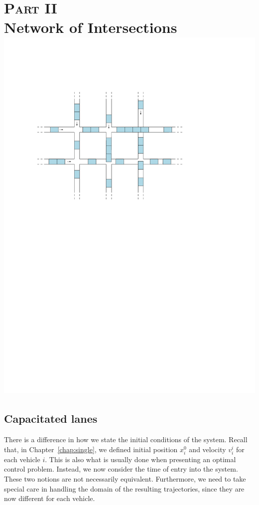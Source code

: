 \documentclass[a4paper]{report}
\theoremstyle{definition}
\theoremstyle{plain}
\newcommand\note[1]{{\color{Navy}#1}}
\begin{document}
\part*{\hspace{-0.8em}\textsc{Part II}\\[0.6em] Network of Intersections\\[3em]
       \centering\includegraphics[scale=1]{figures/network-intersections}}

\chapter{Capacitated lanes}\label{chap:network}

\note{
There is a difference in how we state the initial conditions of the system.
%
Recall that, in Chapter~\ref{chap:single}, we defined initial position
$x_{i}^{0}$ and velocity $v_{i}^{i}$ for each vehicle $i$.
This is also what is usually done when presenting an optimal control problem.
%
Instead, we now consider the time of entry into the system.
%
These two notions are not necessarily equivalent.
%
Furthermore, we need to take special care in handling the domain of the
resulting trajectories, since they are now different for each vehicle.
}
\end{document}
